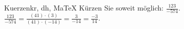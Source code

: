 \begin{MAufgabe}{Kuerzen}{kr, dh, MaTeX}
K\"urzen Sie soweit m\"oglich: $\frac{123}{-574}$.\\ 
\ifLsg\MLoesung
\quad $\frac{123}{-574}=\frac{(41)\cdot(3)}{(41)\cdot(-14)}=\frac{3}{-14}=\frac{-3}{14}$.\else\relax\fi
 \end{MAufgabe}